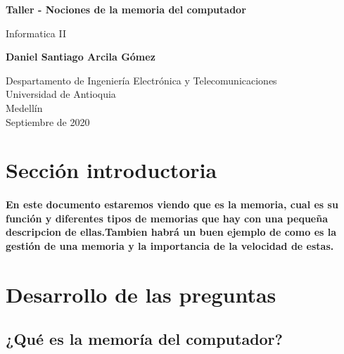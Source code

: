\documentclass{article}
\begin{document}
\begin{titlepage}
    \begin{center}
        \vspace*{1cm}
            
        \Huge
        \textbf{Taller - Nociones de la memoria del computador}
            
        \vspace{0.5cm}
        \LARGE
        Informatica II
            
        \vspace{1.5cm}
            
        \textbf{Daniel Santiago Arcila Gómez}
            
        \vfill
            
        \vspace{0.8cm}
            
        \Large
        Despartamento de Ingeniería Electrónica y Telecomunicaciones\\
        Universidad de Antioquia\\
        Medellín\\
        Septiembre de 2020
            
    \end{center}
\end{titlepage}

\tableofcontents

\section{Sección introductoria}

\paragraph{En este documento estaremos viendo que es la memoria, cual es su función y diferentes tipos de memorias que hay con una pequeña descripcion de ellas.Tambien habrá un buen ejemplo de como es la gestión de una memoria y la importancia de la velocidad de estas.}

\section{Desarrollo de las preguntas} \label{contenido}

\subsection{¿Qué es la memoría del computador?}
\end{document}
